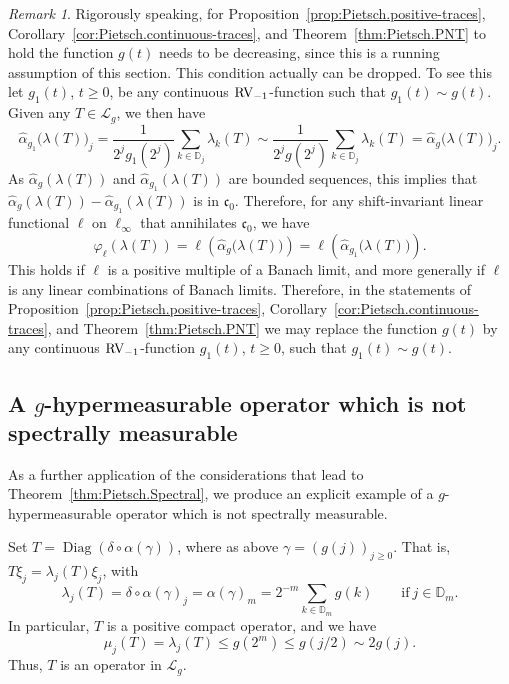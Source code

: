 \documentclass[10pt, a4paper]{amsart}
\newcommand{\D}{\mathbb{D}}
\newcommand{\sL}{\mathscr{L}}
\newcommand{\co}{\mathfrak{c}_{0}}
\newcommand{\op}{\operatorname}
\numberwithin{equation}{section}
\theoremstyle{definition}
\theoremstyle{remark}
\newtheorem{remark}[theorem]{Remark}
\newcommand{\RV}{\textup{RV}}
\newcommand{\Diag}{\op{Diag}}
\begin{document}
\begin{remark}\label{rmk:Pietsch.independence-g}
 Rigorously speaking, for Proposition~\ref{prop:Pietsch.positive-traces}, Corollary~\ref{cor:Pietsch.continuous-traces}, and Theorem~\ref{thm:Pietsch.PNT} to hold the function $g(t)$ needs to be decreasing, since this is a running assumption of this section. This condition actually can be dropped. To see this let $g_1(t)$, $t\geq 0$, be any continuous $\RV_{-1}$-function such that $g_1(t)\sim g(t)$. Given any $T\in \sL_g$, we then have
 \begin{equation*}
 \hat{\alpha}_{g_1}\big(\lambda(T)\big)_j= \frac{1}{2^jg_1(2^j)} \sum_{k\in \D_j} \lambda_k (T)\sim  \frac{1}{2^jg(2^j)} \sum_{k\in \D_j}\lambda_k (T)= \hat{\alpha}_g\big(\lambda(T)\big)_j.
\end{equation*}
As $ \hat{\alpha}_{g}(\lambda(T))$ and  $ \hat{\alpha}_{g_1}(\lambda(T))$ are bounded sequences, this implies that  $ \hat{\alpha}_{g}(\lambda(T))- \hat{\alpha}_{g_1}(\lambda(T))$ is in $\co$. Therefore, for any shift-invariant linear functional $\ell$ on $\ell_\infty$ that annihilates $\co$, we have
\begin{equation*}
 \varphi_\ell\left(\lambda(T)\right)= \ell\left(\hat{\alpha}_g\big(\lambda(T)\big)\right) = \ell\left(\hat{\alpha}_{g_1}\big(\lambda(T)\big)\right).
\end{equation*}
This holds if $\ell$ is a positive multiple of a Banach limit, and more generally if $\ell$ is any linear combinations of Banach limits. Therefore, in the statements of Proposition~\ref{prop:Pietsch.positive-traces}, Corollary~\ref{cor:Pietsch.continuous-traces}, and Theorem~\ref{thm:Pietsch.PNT} we may replace the function $g(t)$ by any continuous $\RV_{-1}$-function  $g_1(t)$, $t\geq 0$, such that $g_1(t)\sim g(t)$.
\end{remark}

\subsection{A $g$-hypermeasurable operator which is not spectrally measurable}\label{subsec:hyper-not-spec}
As a further application of the considerations that lead to Theorem~\ref{thm:Pietsch.Spectral}, we produce an explicit example of a $g$-hypermeasurable operator which is not spectrally measurable.

Set $T=\Diag(\delta\circ \alpha(\gamma))$, where as above $\gamma=(g(j))_{j\geq 0}$. That is, $T\xi_j=\lambda_j(T)\xi_j$, with
\begin{equation*}
 \lambda_j(T)=\delta\circ \alpha(\gamma)_j=\alpha(\gamma)_m=2^{-m} \sum_{k\in \D_m} g(k) \qquad \text{if}\ j\in \D_m.
\end{equation*}
In particular, $T$ is a positive compact operator, and we have
\begin{equation*}
 \mu_j(T)=\lambda_j(T)\leq g(2^m)\leq g(j/2)\sim 2g(j).
\end{equation*}
Thus, $T$ is an operator in $\sL_g$.
\end{document}

